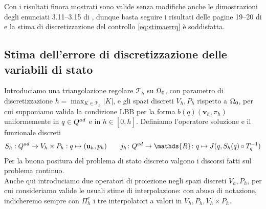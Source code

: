 %
Con i risultati finora mostrati sono valide senza modifiche anche le dimostrazioni degli enunciati 3.11--3.15 di \cite{Kinigera}, dunque basta seguire i risultati delle pagine 19--20 di \cite{Kinigera} e la stima di discretizzazione del controllo \eqref{eq:stimaerrq} è soddisfatta.\\

\subsection{Stima dell'errore di discretizzazione delle variabili di stato}

Introduciamo una triangolazione regolare $\mathcal{T}_h$ su ${\Omega_0}$, con parametro di discretizzazione $h=\max_{K\in\mathcal{T}_h}|K|$, e gli spazi discreti $V_h,P_h$ rispetto a ${\Omega_0}$, per cui supponiamo valida la condizione LBB per la forma $b(q)(\mathbf v_h,\pi_h)$ uniformemente in $q\in Q^{ad}$ e in $h\in[0,\overline{h}]$. Definiamo l'operatore soluzione e il funzionale discreti
$$ S_h:\Q\to V_h\times P_h:q\mapsto(\u_h,p_h)\qquad j_h\colon\Q\to\mathds{R}\colon q\mapsto J(q,S_h(q)\circ T_q^{-1})$$
Per la buona positura del problema di stato discreto valgono i discorsi fatti sul problema continuo.\\
Anche qui introduciamo due operatori di proiezione negli spazi discreti $V_h,P_h$, per cui consideriamo valide le usuali stime di interpolazione: con abuso di notazione, indicheremo sempre con $\Pi^r_h$ i tre interpolatori a valori in $V_h,P_h,V_h\times P_h$.\\

